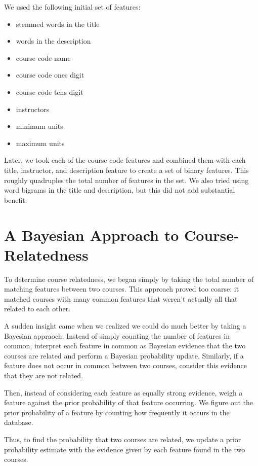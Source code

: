 \documentclass[12pt]{article}
\begin{document}
We used the following initial set of features: 

\begin{itemize}
\item stemmed words in the title
\item words in the description
\item course code name
\item course code ones digit
\item course code tens digit
\item instructors
\item minimum units
\item maximum units
\end{itemize}  

Later, we took each of the course code features and combined them with
each title, instructor, and description feature to create a set of
binary features. This roughly quadruples the total number of features
in the set. We also tried using word bigrams in the title and
description, but this did not add substantial benefit.

\section*{A Bayesian Approach to Course-Relatedness}

To determine course relatedness, we began simply by taking the total
number of matching features between two courses. This approach proved
too coarse: it matched courses with many common features that weren't
actually all that related to each other.

A sudden insight came when we realized we could do much better by
taking a Bayesian appraoch. Instead of simply counting the number of
features in common, interpret each feature in common as Bayesian
evidence that the two courses are related and perform a Bayesian
probability update. Similarly, if a feature does not occur in common
between two courses, consider this evidence that they are not related.

Then, instead of considering each feature as equally strong evidence,
weigh a feature against the prior probability of that feature
occurring. We figure out the prior probability of a feature by
counting how frequently it occurs in the database.

Thus, to find the probability that two courses are related, we update
a prior probability estimate with the evidence given by each feature
found in the two courses.
\end{document}
